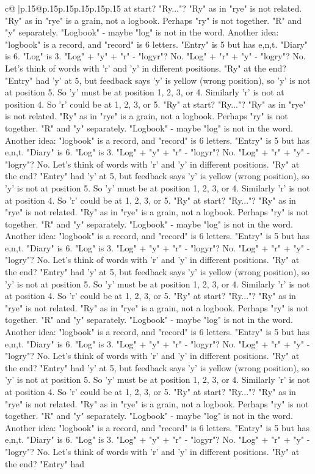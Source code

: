 \documentclass{article}
\begin{document}
{\begin{supertabular}{c@{$\;$}|p{.15\linewidth}@{}p{.15\linewidth}p{.15\linewidth}p{.15\linewidth}p{.15\linewidth}p{.15\linewidth}}
{{{at start? "Ry..."? "Ry" as in "rye" is not related. "Ry" as in "rye" is a grain, not a logbook. Perhaps "ry" is not together. "R" and "y" separately. "Logbook" {-} maybe "log" is not in the word. Another idea: "logbook" is a record, and "record" is 6 letters. "Entry" is 5 but has e,n,t. "Diary" is 6. "Log" is 3. "Log" + "y" + "r" {-} "logyr"? No. "Log" + "r" + "y" {-} "logry"? No. Let's think of words with 'r' and 'y' in different positions. "Ry" at the end? "Entry" had 'y' at 5, but feedback says 'y' is yellow (wrong position), so 'y' is not at position 5. So 'y' must be at position 1, 2, 3, or 4. Similarly 'r' is not at position 4. So 'r' could be at 1, 2, 3, or 5. "Ry" at start? "Ry..."? "Ry" as in "rye" is not related. "Ry" as in "rye" is a grain, not a logbook. Perhaps "ry" is not together. "R" and "y" separately. "Logbook" {-} maybe "log" is not in the word. Another idea: "logbook" is a record, and "record" is 6 letters. "Entry" is 5 but has e,n,t. "Diary" is 6. "Log" is 3. "Log" + "y" + "r" {-} "logyr"? No. "Log" + "r" + "y" {-} "logry"? No. Let's think of words with 'r' and 'y' in different positions. "Ry" at the end? "Entry" had 'y' at 5, but feedback says 'y' is yellow (wrong position), so 'y' is not at position 5. So 'y' must be at position 1, 2, 3, or 4. Similarly 'r' is not at position 4. So 'r' could be at 1, 2, 3, or 5. "Ry" at start? "Ry..."? "Ry" as in "rye" is not related. "Ry" as in "rye" is a grain, not a logbook. Perhaps "ry" is not together. "R" and "y" separately. "Logbook" {-} maybe "log" is not in the word. Another idea: "logbook" is a record, and "record" is 6 letters. "Entry" is 5 but has e,n,t. "Diary" is 6. "Log" is 3. "Log" + "y" + "r" {-} "logyr"? No. "Log" + "r" + "y" {-} "logry"? No. Let's think of words with 'r' and 'y' in different positions. "Ry" at the end? "Entry" had 'y' at 5, but feedback says 'y' is yellow (wrong position), so 'y' is not at position 5. So 'y' must be at position 1, 2, 3, or 4. Similarly 'r' is not at position 4. So 'r' could be at 1, 2, 3, or 5. "Ry" at start? "Ry..."? "Ry" as in "rye" is not related. "Ry" as in "rye" is a grain, not a logbook. Perhaps "ry" is not together. "R" and "y" separately. "Logbook" {-} maybe "log" is not in the word. Another idea: "logbook" is a record, and "record" is 6 letters. "Entry" is 5 but has e,n,t. "Diary" is 6. "Log" is 3. "Log" + "y" + "r" {-} "logyr"? No. "Log" + "r" + "y" {-} "logry"? No. Let's think of words with 'r' and 'y' in different positions. "Ry" at the end? "Entry" had 'y' at 5, but feedback says 'y' is yellow (wrong position), so 'y' is not at position 5. So 'y' must be at position 1, 2, 3, or 4. Similarly 'r' is not at position 4. So 'r' could be at 1, 2, 3, or 5. "Ry" at start? "Ry..."? "Ry" as in "rye" is not related. "Ry" as in "rye" is a grain, not a logbook. Perhaps "ry" is not together. "R" and "y" separately. "Logbook" {-} maybe "log" is not in the word. Another idea: "logbook" is a record, and "record" is 6 letters. "Entry" is 5 but has e,n,t. "Diary" is 6. "Log" is 3. "Log" + "y" + "r" {-} "logyr"? No. "Log" + "r" + "y" {-} "logry"? No. Let's think of words with 'r' and 'y' in different positions. "Ry" at the end? "Entry" had }}}
\end{supertabular}}
\end{document}
